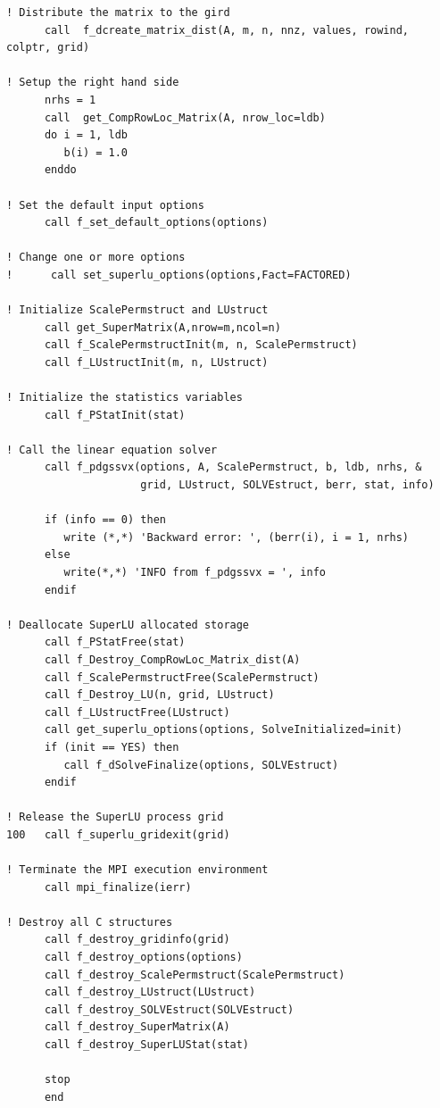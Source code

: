 \begin{verbatim}
! Distribute the matrix to the gird
      call  f_dcreate_matrix_dist(A, m, n, nnz, values, rowind, colptr, grid)

! Setup the right hand side
      nrhs = 1
      call  get_CompRowLoc_Matrix(A, nrow_loc=ldb)
      do i = 1, ldb
         b(i) = 1.0
      enddo

! Set the default input options
      call f_set_default_options(options)

! Change one or more options
!      call set_superlu_options(options,Fact=FACTORED)

! Initialize ScalePermstruct and LUstruct
      call get_SuperMatrix(A,nrow=m,ncol=n)
      call f_ScalePermstructInit(m, n, ScalePermstruct)
      call f_LUstructInit(m, n, LUstruct)

! Initialize the statistics variables
      call f_PStatInit(stat)

! Call the linear equation solver
      call f_pdgssvx(options, A, ScalePermstruct, b, ldb, nrhs, &
                     grid, LUstruct, SOLVEstruct, berr, stat, info)

      if (info == 0) then
         write (*,*) 'Backward error: ', (berr(i), i = 1, nrhs)
      else
         write(*,*) 'INFO from f_pdgssvx = ', info
      endif

! Deallocate SuperLU allocated storage
      call f_PStatFree(stat)
      call f_Destroy_CompRowLoc_Matrix_dist(A)
      call f_ScalePermstructFree(ScalePermstruct)
      call f_Destroy_LU(n, grid, LUstruct)
      call f_LUstructFree(LUstruct)
      call get_superlu_options(options, SolveInitialized=init)
      if (init == YES) then
         call f_dSolveFinalize(options, SOLVEstruct)
      endif

! Release the SuperLU process grid
100   call f_superlu_gridexit(grid)

! Terminate the MPI execution environment
      call mpi_finalize(ierr)

! Destroy all C structures
      call f_destroy_gridinfo(grid)
      call f_destroy_options(options)
      call f_destroy_ScalePermstruct(ScalePermstruct)
      call f_destroy_LUstruct(LUstruct)
      call f_destroy_SOLVEstruct(SOLVEstruct)
      call f_destroy_SuperMatrix(A)
      call f_destroy_SuperLUStat(stat)

      stop
      end
\end{verbatim}

